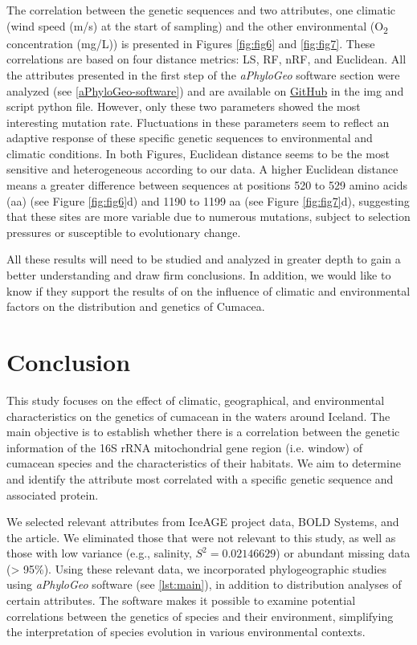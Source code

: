 The correlation between the genetic sequences and two attributes, one climatic (wind speed (m/s) at the start of sampling) and the other environmental (O\textsubscript{2} concentration (mg/L)) is presented in Figures \ref{fig:fig6} and \ref{fig:fig7}. These correlations are based on four distance metrics: LS, RF, nRF, and Euclidean. All the attributes presented in the first step of the \textit{aPhyloGeo} software section were analyzed (see \autoref{aPhyloGeo-software}) and are available on \href{https://github.com/tahiri-lab/Cumacea_aPhyloGeo}{GitHub} in the img and script python file. However, only these two parameters showed the most interesting mutation rate. Fluctuations in these parameters seem to reflect an adaptive response of these specific genetic sequences to environmental and climatic conditions. In both Figures, Euclidean distance seems to be the most sensitive and heterogeneous according to our data. A higher Euclidean distance means a greater difference between sequences at positions 520 to 529 amino acids (aa) (see Figure \ref{fig:fig6}d) and 1190 to 1199 aa (see Figure \ref{fig:fig7}d), suggesting that these sites are more variable due to numerous mutations, subject to selection pressures or susceptible to evolutionary change. 

All these results will need to be studied and analyzed in greater depth to gain a better understanding and draw firm conclusions. In addition, we would like to know if they support the results of \citep{uhlir_adding_2021} on the influence of climatic and environmental factors on the distribution and genetics of Cumacea.

\section{Conclusion}\label{conclusion}

This study focuses on the effect of climatic, geographical, and environmental characteristics on the genetics of cumacean in the waters around Iceland. The main objective is to establish whether there is a correlation between the genetic information of the 16S rRNA mitochondrial gene region (i.e. window) of cumacean species and the characteristics of their habitats. We aim to determine and identify the attribute most correlated with a specific genetic sequence and associated protein.

We selected relevant attributes from IceAGE project data, BOLD Systems, and the \citep{uhlir_adding_2021} article. We eliminated those that were not relevant to this study, as well as those with low variance (e.g., salinity, $S^2 = 0.02146629$) or abundant missing data (> 95\%). Using these relevant data, we incorporated phylogeographic studies using \textit{aPhyloGeo} software (see \autoref{lst:main}), in addition to distribution analyses of certain attributes. The software makes it possible to examine potential correlations between the genetics of species and their environment, simplifying the interpretation of species evolution in various environmental contexts.

